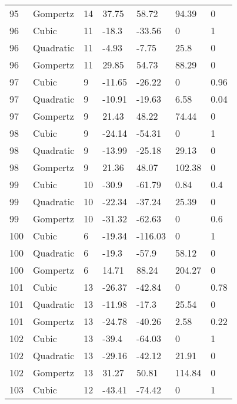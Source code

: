 \documentclass[11pt]{article}
\begin{document}
\begin{center}
\begin{longtable}{lllllll}
    95  & Gompertz  & 14              & 37.75   & 58.72   & 94.39   & 0    \\
    96  & Cubic     & 11              & -18.3   & -33.56  & 0       & 1    \\
    96  & Quadratic & 11              & -4.93   & -7.75   & 25.8    & 0    \\
    96  & Gompertz  & 11              & 29.85   & 54.73   & 88.29   & 0    \\
    97  & Cubic     & 9               & -11.65  & -26.22  & 0       & 0.96 \\
    97  & Quadratic & 9               & -10.91  & -19.63  & 6.58    & 0.04 \\
    97  & Gompertz  & 9               & 21.43   & 48.22   & 74.44   & 0    \\
    98  & Cubic     & 9               & -24.14  & -54.31  & 0       & 1    \\
    98  & Quadratic & 9               & -13.99  & -25.18  & 29.13   & 0    \\
    98  & Gompertz  & 9               & 21.36   & 48.07   & 102.38  & 0    \\
    99  & Cubic     & 10              & -30.9   & -61.79  & 0.84    & 0.4  \\
    99  & Quadratic & 10              & -22.34  & -37.24  & 25.39   & 0    \\
    99  & Gompertz  & 10              & -31.32  & -62.63  & 0       & 0.6  \\
    100 & Cubic     & 6               & -19.34  & -116.03 & 0       & 1    \\
    100 & Quadratic & 6               & -19.3   & -57.9   & 58.12   & 0    \\
    100 & Gompertz  & 6               & 14.71   & 88.24   & 204.27  & 0    \\
    101 & Cubic     & 13              & -26.37  & -42.84  & 0       & 0.78 \\
    101 & Quadratic & 13              & -11.98  & -17.3   & 25.54   & 0    \\
    101 & Gompertz  & 13              & -24.78  & -40.26  & 2.58    & 0.22 \\
    102 & Cubic     & 13              & -39.4   & -64.03  & 0       & 1    \\
    102 & Quadratic & 13              & -29.16  & -42.12  & 21.91   & 0    \\
    102 & Gompertz  & 13              & 31.27   & 50.81   & 114.84  & 0    \\
    103 & Cubic     & 12              & -43.41  & -74.42  & 0       & 1    \\

\end{longtable}
\end{center}
\end{document}
